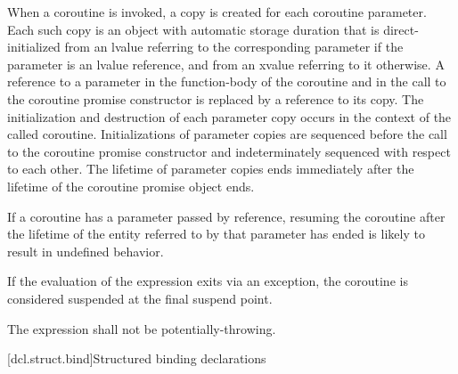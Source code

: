 \pnum
When a coroutine is invoked, a copy is created for each coroutine parameter.
Each such copy is an object with automatic storage duration that is
direct-initialized from an lvalue referring to the corresponding parameter if
the parameter is an lvalue reference, and from an xvalue referring to it
otherwise. A reference to a parameter in the function-body of the coroutine
and in the call to the coroutine promise constructor is replaced by a
reference to its copy.
The initialization and destruction of each parameter copy occurs in the
context of the called coroutine.
Initializations of parameter copies are sequenced before the call to the
coroutine promise constructor and indeterminately sequenced with respect to
each other.
The lifetime of parameter copies ends immediately after the lifetime of the
coroutine promise object ends.
\begin{note}
If a coroutine has a parameter passed by reference, resuming the coroutine
after the lifetime of the entity referred to by that parameter has ended is
likely to result in undefined behavior.
\end{note}

\pnum
If the evaluation of the expression
 exits via an exception,
the coroutine is considered suspended at the final suspend point.

\pnum
The expression  
shall not be potentially-throwing.

[dcl.struct.bind]{Structured binding declarations}%
%
%

